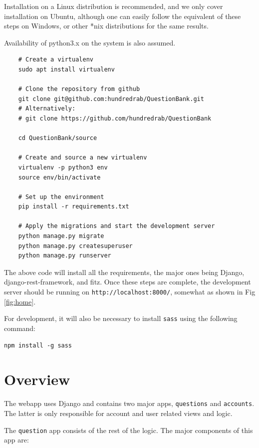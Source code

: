 \documentclass[13pt]{article}
\begin{document}
Installation on a Linux distribution is recommended, and we only cover installation on Ubuntu, although one can easily follow the equivalent of these steps on Windows, or other *nix distributions for the same results.\par
Availability of python3.x on the system is also assumed.
\begin{verbatim}
    # Create a virtualenv
    sudo apt install virtualenv

    # Clone the repository from github
    git clone git@github.com:hundredrab/QuestionBank.git
    # Alternatively:
    # git clone https://github.com/hundredrab/QuestionBank
    
    cd QuestionBank/source
    
    # Create and source a new virtualenv
    virtualenv -p python3 env
    source env/bin/activate
    
    # Set up the environment
    pip install -r requirements.txt
    
    # Apply the migrations and start the development server
    python manage.py migrate
    python manage.py createsuperuser
    python manage.py runserver
\end{verbatim}

The above code will install all the requirements, the major ones being Django, django-rest-framework, and fitz.
Once these steps are complete, the development server should be running on \texttt{http://localhost:8000/}, somewhat as shown in Fig \ref{fig:home}.\par

For development, it will also be necessary to install \texttt{sass} using the following command:\par
\begin{verbatim}
npm install -g sass
\end{verbatim}
\newpage

\section{Overview}
The webapp uses Django and contains two major apps, \texttt{questions} and \texttt{accounts}. The latter is only responsible for account and user related views and logic.\par

The \texttt{question} app consists of the rest of the logic. The major components of this app are:\\\\
\par
\end{document}
